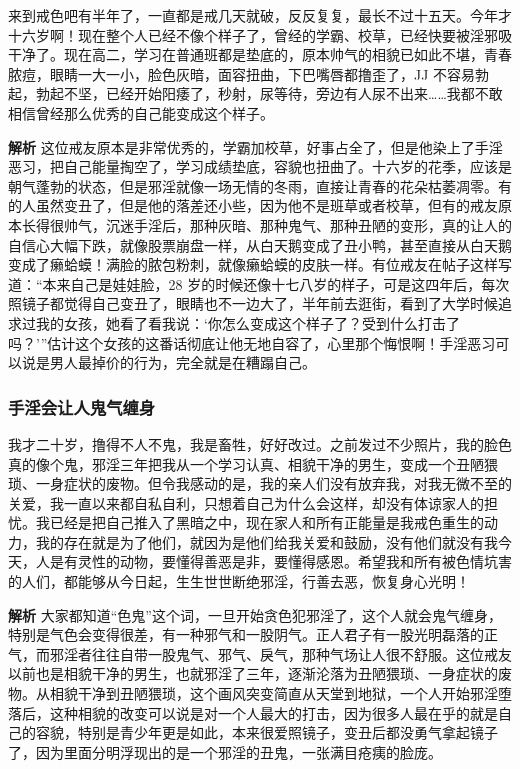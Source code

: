\begin{case}
    来到戒色吧有半年了，一直都是戒几天就破，反反复复，最长不过十五天。今年才十六岁啊！现在整个人已经不像个样子了，曾经的学霸、校草，已经快要被淫邪吸干净了。现在高二，学习在普通班都是垫底的，原本帅气的相貌已如此不堪，青春脓痘，眼睛一大一小，脸色灰暗，面容扭曲，下巴嘴唇都撸歪了，JJ 不容易勃起，勃起不坚，已经开始阳痿了，秒射，尿等待，旁边有人尿不出来……我都不敢相信曾经那么优秀的自己能变成这个样子。

    \textbf{解析} 这位戒友原本是非常优秀的，学霸加校草，好事占全了，但是他染上了手淫恶习，把自己能量掏空了，学习成绩垫底，容貌也扭曲了。十六岁的花季，应该是朝气蓬勃的状态，但是邪淫就像一场无情的冬雨，直接让青春的花朵枯萎凋零。有的人虽然变丑了，但是他的落差还小些，因为他不是班草或者校草，但有的戒友原本长得很帅气，沉迷手淫后，那种灰暗、那种鬼气、那种丑陋的变形，真的让人的自信心大幅下跌，就像股票崩盘一样，从白天鹅变成了丑小鸭，甚至直接从白天鹅变成了癞蛤蟆！满脸的脓包粉刺，就像癞蛤蟆的皮肤一样。有位戒友在帖子这样写道：“本来自己是娃娃脸，28 岁的时候还像十七八岁的样子，可是这四年后，每次照镜子都觉得自己变丑了，眼睛也不一边大了，半年前去逛街，看到了大学时候追求过我的女孩，她看了看我说：‘你怎么变成这个样子了？受到什么打击了吗？’”估计这个女孩的这番话彻底让他无地自容了，心里那个悔恨啊！手淫恶习可以说是男人最掉价的行为，完全就是在糟蹋自己。
\end{case}

\subsubsection{手淫会让人鬼气缠身}

\begin{case}
    我才二十岁，撸得不人不鬼，我是畜牲，好好改过。之前发过不少照片，我的脸色真的像个鬼，邪淫三年把我从一个学习认真、相貌干净的男生，变成一个丑陋猥琐、一身症状的废物。但令我感动的是，我的亲人们没有放弃我，对我无微不至的关爱，我一直以来都自私自利，只想着自己为什么会这样，却没有体谅家人的担忧。我已经是把自己推入了黑暗之中，现在家人和所有正能量是我戒色重生的动力，我的存在就是为了他们，就因为是他们给我关爱和鼓励，没有他们就没有我今天，人是有灵性的动物，要懂得善恶是非，要懂得感恩。希望我和所有被色情坑害的人们，都能够从今日起，生生世世断绝邪淫，行善去恶，恢复身心光明！

    \textbf{解析} 大家都知道“色鬼”这个词，一旦开始贪色犯邪淫了，这个人就会鬼气缠身，特别是气色会变得很差，有一种邪气和一股阴气。正人君子有一股光明磊落的正气，而邪淫者往往自带一股鬼气、邪气、戾气，那种气场让人很不舒服。这位戒友以前也是相貌干净的男生，也就邪淫了三年，逐渐沦落为丑陋猥琐、一身症状的废物。从相貌干净到丑陋猥琐，这个画风突变简直从天堂到地狱，一个人开始邪淫堕落后，这种相貌的改变可以说是对一个人最大的打击，因为很多人最在乎的就是自己的容貌，特别是青少年更是如此，本来很爱照镜子，变丑后都没勇气拿起镜子了，因为里面分明浮现出的是一个邪淫的丑鬼，一张满目疮痍的脸庞。
\end{case}

